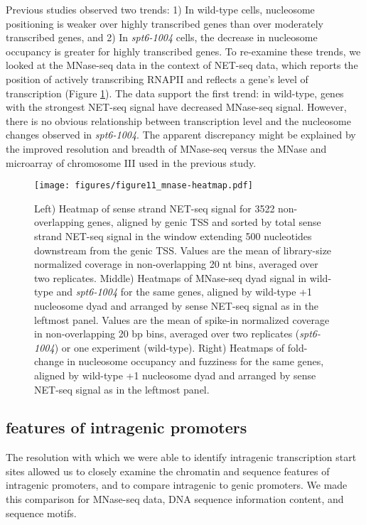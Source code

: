 \documentclass[9pt, letterpaper]{article}
\begin{document}
Previous studies observed two trends: 1) In wild-type cells, nucleosome positioning is weaker over highly transcribed genes than over moderately transcribed genes, and 2) In \textit{spt6-1004} cells, the decrease in nucleosome occupancy is greater for highly transcribed genes. To re-examine these trends, we looked at the MNase-seq data in the context of NET-seq data, which reports the position of actively transcribing RNAPII and reflects a gene's level of transcription (Figure \ref{fig:mnase_heatmap}). The data support the first trend: in wild-type, genes with the strongest NET-seq signal have decreased MNase-seq signal. However, there is no obvious relationship between transcription level and the nucleosome changes observed in \textit{spt6-1004}. The apparent discrepancy might be explained by the improved resolution and breadth of MNase-seq versus the MNase and microarray of chromosome III used in the previous study.

\begin{figure}[H]
\centering
\texttt{[image: figures/figure11\_mnase-heatmap.pdf]}
\caption{Left) Heatmap of sense strand NET-seq signal for 3522 non-overlapping genes, aligned by genic TSS and sorted by total sense strand NET-seq signal in the window extending 500 nucleotides downstream from the genic TSS. Values are the mean of library-size normalized coverage in non-overlapping 20 nt bins, averaged over two replicates. Middle) Heatmaps of MNase-seq dyad signal in wild-type and \textit{spt6-1004} for the same genes, aligned by wild-type +1 nucleosome dyad and arranged by sense NET-seq signal as in the leftmost panel. Values are the mean of spike-in normalized coverage in non-overlapping 20 bp bins, averaged over two replicates (\textit{spt6-1004}) or one experiment (wild-type). Right) Heatmaps of fold-change in nucleosome occupancy and fuzziness for the same genes, aligned by wild-type +1 nucleosome dyad and arranged by sense NET-seq signal as in the leftmost panel.}
\label{fig:mnase_heatmap}
\end{figure}

\subsection{features of intragenic promoters}

The resolution with which we were able to identify intragenic transcription start sites allowed us to closely examine the chromatin and sequence features of intragenic promoters, and to compare intragenic to genic promoters. We made this comparison for MNase-seq data, DNA sequence information content, and sequence motifs.
\end{document}
